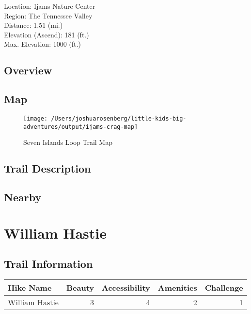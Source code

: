 \documentclass[
]{book}
\begin{document}
Location: Ijams Nature Center\\
Region: The Tennessee Valley\\
Distance: 1.51 (mi.)\\
Elevation (Ascend): 181 (ft.)\\
Max. Elevation: 1000 (ft.)

\hypertarget{overview-1}{%
\section{Overview}\label{overview-1}}

\hypertarget{map-1}{%
\section{Map}\label{map-1}}

\begin{figure}
\texttt{[image: /Users/joshuarosenberg/little-kids-big-adventures/output/ijams-crag-map]} \caption{Seven Islands Loop Trail Map}\label{fig:unnamed-chunk-11}
\end{figure}

\hypertarget{trail-description-1}{%
\section{Trail Description}\label{trail-description-1}}

\hypertarget{nearby-1}{%
\section{Nearby}\label{nearby-1}}

\hypertarget{william-hastie}{%
\chapter{William Hastie}\label{william-hastie}}

\hypertarget{trail-information-2}{%
\section{Trail Information}\label{trail-information-2}}

\begin{tabular}{l|r|r|r|r}
\hline
Hike Name & Beauty & Accessibility & Amenities & Challenge\\
\hline
William Hastie & 3 & 4 & 2 & 1\\
\hline
\end{tabular}
\end{document}
